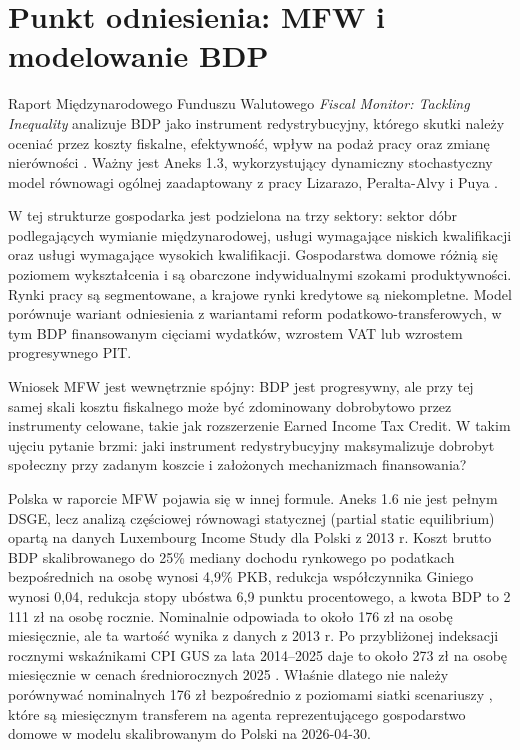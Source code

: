 \section{Punkt odniesienia: MFW i modelowanie BDP}

Raport Międzynarodowego Funduszu Walutowego \textit{Fiscal Monitor: Tackling Inequality} analizuje BDP jako instrument redystrybucyjny, którego skutki należy oceniać przez koszty fiskalne, efektywność, wpływ na podaż pracy oraz zmianę nierówności \parencite{imf2017fiscal}. Ważny jest Aneks 1.3, wykorzystujący dynamiczny stochastyczny model równowagi ogólnej zaadaptowany z pracy Lizarazo, Peralta-Alvy i Puya \parencite{lizarazo2017}.

W tej strukturze gospodarka jest podzielona na trzy sektory: sektor dóbr podlegających wymianie międzynarodowej, usługi wymagające niskich kwalifikacji oraz usługi wymagające wysokich kwalifikacji. Gospodarstwa domowe różnią się poziomem wykształcenia i są obarczone indywidualnymi szokami produktywności. Rynki pracy są segmentowane, a krajowe rynki kredytowe są niekompletne. Model porównuje wariant odniesienia z wariantami reform podatkowo-transferowych, w tym BDP finansowanym cięciami wydatków, wzrostem VAT lub wzrostem progresywnego PIT.

Wniosek MFW jest wewnętrznie spójny: BDP jest progresywny, ale przy tej samej skali kosztu fiskalnego może być zdominowany dobrobytowo przez instrumenty celowane, takie jak rozszerzenie Earned Income Tax Credit. W takim ujęciu pytanie brzmi: jaki instrument redystrybucyjny maksymalizuje dobrobyt społeczny przy zadanym koszcie i założonych mechanizmach finansowania?

Polska w raporcie MFW pojawia się w innej formule. Aneks 1.6 nie jest pełnym DSGE, lecz analizą częściowej równowagi statycznej (partial static equilibrium) opartą na danych Luxembourg Income Study dla Polski z 2013 r. Koszt brutto BDP skalibrowanego do 25\% mediany dochodu rynkowego po podatkach bezpośrednich na osobę wynosi 4,9\% PKB, redukcja współczynnika Giniego wynosi 0,04, redukcja stopy ubóstwa 6,9 punktu procentowego, a kwota BDP to 2 111 zł na osobę rocznie. Nominalnie odpowiada to około 176 zł na osobę miesięcznie, ale ta wartość wynika z danych z 2013 r. Po przybliżonej indeksacji rocznymi wskaźnikami CPI GUS za lata 2014--2025 daje to około 273 zł na osobę miesięcznie w cenach średniorocznych 2025 \parencite{gusCpiAnnual}. Właśnie dlatego nie należy porównywać nominalnych 176 zł bezpośrednio z poziomami siatki scenariuszy \amor{}, które są miesięcznym transferem na agenta reprezentującego gospodarstwo domowe w modelu skalibrowanym do Polski na 2026-04-30.

